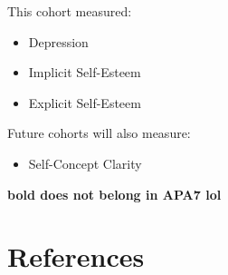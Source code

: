 \documentclass[
  man,
  floatsintext,
  longtable,
  nolmodern,
  notxfonts,
  notimes,
  colorlinks=true,linkcolor=blue,citecolor=blue,urlcolor=blue]{apa7}
\providecommand{\tightlist}{%
  \setlength{\itemsep}{0pt}\setlength{\parskip}{0pt}}
\begin{document}
This cohort measured:

\begin{itemize}
\item
  Depression
\item
  Implicit Self-Esteem
\item
  Explicit Self-Esteem
\end{itemize}

Future cohorts will also measure:

\begin{itemize}
\tightlist
\item
  Self-Concept Clarity
\end{itemize}

\textbf{bold does not belong in APA7 lol}

\section{References}\label{references}
\end{document}
